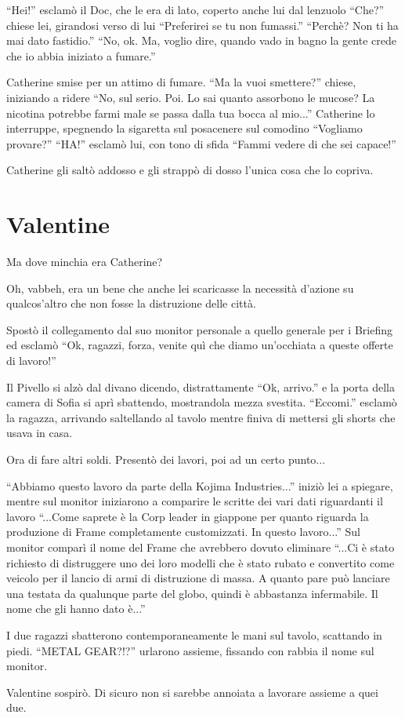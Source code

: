     ``Hei!'' esclamò il Doc, che le era di lato, coperto anche lui dal lenzuolo ``Che?'' chiese lei, girandosi verso di
    lui ``Preferirei se tu non fumassi.'' ``Perchè? Non ti ha mai dato fastidio.'' ``No, ok. Ma, voglio dire, quando
    vado in bagno la gente crede che io abbia iniziato a fumare.''

    Catherine smise per un attimo di fumare. ``Ma la vuoi smettere?'' chiese, iniziando a ridere ``No, sul serio. Poi.
    Lo sai quanto assorbono le mucose? La nicotina potrebbe farmi male se passa dalla tua bocca al mio...'' Catherine lo
    interruppe, spegnendo la sigaretta sul posacenere sul comodino ``Vogliamo provare?'' ``HA!'' esclamò lui, con tono
    di sfida ``Fammi vedere di che sei capace!''

    Catherine gli saltò addosso e gli strappò di dosso l'unica cosa che lo copriva.

  \section*{Valentine}

    Ma dove minchia era Catherine?

    Oh, vabbeh, era un bene che anche lei scaricasse la necessità d'azione su qualcos'altro che non fosse la distruzione
    delle città.

    Spostò il collegamento dal suo monitor personale a quello generale per i Briefing ed esclamò ``Ok, ragazzi, forza,
    venite quì che diamo un'occhiata a queste offerte di lavoro!''

    Il Pivello si alzò dal divano dicendo, distrattamente ``Ok, arrivo.'' e la porta della camera di Sofia si aprì
    sbattendo, mostrandola mezza svestita. ``Eccomi.'' esclamò la ragazza, arrivando saltellando al tavolo mentre finiva
    di mettersi gli shorts che usava in casa.

    Ora di fare altri soldi. Presentò dei lavori, poi ad un certo punto...

    ``Abbiamo questo lavoro da parte della Kojima Industries...'' iniziò lei a spiegare, mentre sul monitor iniziarono a
    comparire le scritte dei vari dati riguardanti il lavoro ``...Come saprete è la Corp leader in giappone per quanto
    riguarda la produzione di Frame completamente customizzati. In questo lavoro...'' Sul monitor comparì il nome del
    Frame che avrebbero dovuto eliminare ``...Ci è stato richiesto di distruggere uno dei loro modelli che è stato
    rubato e convertito come veicolo per il lancio di armi di distruzione di massa. A quanto pare può lanciare una
    testata da qualunque parte del globo, quindi è abbastanza infermabile. Il nome che gli hanno dato è...''

    I due ragazzi sbatterono contemporaneamente le mani sul tavolo, scattando in piedi. ``METAL GEAR?!?'' urlarono
    assieme, fissando con rabbia il nome sul monitor.

    Valentine sospirò. Di sicuro non si sarebbe annoiata a lavorare assieme a quei due.
